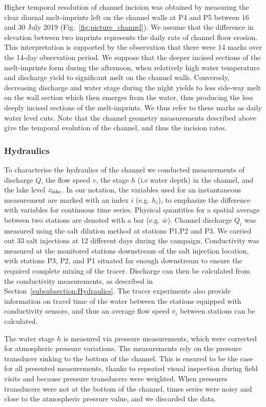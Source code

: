Higher temporal resolution of channel incision was obtained by measuring the clear diurnal melt-imprints left on the channel walls at P4 and P5 between 16 and 30 July 2019 (Fig.~\ref{fig:picture_channel}). We assume that the difference in elevation between two imprints represents the daily rate of channel floor erosion. This interpretation is supported by the observation that there were 14 marks over the 14-day observation period. We suppose that the deeper incised sections of the melt-imprints form during the afternoon, when relatively high water temperature and discharge yield to significant melt on the channel walls. Conversely, decreasing discharge and water stage during the night yields to less side-way melt on the wall section which then emerges from the water, thus producing the less deeply incised sections of the melt-imprints. We thus refer to these marks as daily water level cuts.
Note that the channel geometry measurements described above give the temporal evolution of the channel, and thus the incision rates.


\subsubsection{Hydraulics}

To characterise the hydraulics of the channel we conducted measurements of discharge $Q$, the flow speed $v$, the stage $h$ (i.e water depth) in the channel, and the lake level $z_{\rm lake }$. In our notation, the variables used for an instantaneous measurement are marked with an index $i$ (e.g. $h_i$), to emphasize the difference with variables for continuous time series. Physical quantities for a spatial average between two stations are denoted with a bar (e.g. $\bar w$).
Channel discharge $Q_i$ was measured using the salt dilution method \citep{Hubbard&Glasser2005} at stations P1,P2 and P3.
We carried out 33 salt injections at 12 different days during the campaign. Conductivity was measured at the monitored stations downstream of the salt injection location, with stations P3, P2, and P1 situated far enough downstream to ensure the required complete mixing of the tracer.
Discharge can then be calculated from the conductivity measurements, as described in Section~\ref{subsubsection:Hydraulics}.
%
The tracer experiments also provide information on travel time of the water between the stations equipped with conductivity sensors, and thus an average flow speed $\bar v_i$ between stations can be calculated.

The water stage $h$ is measured via pressure measurements, which were corrected for atmospheric pressure variations. The measurements rely on the pressure transducer sinking to the bottom of the channel. This is ensured to be the case for all presented measurements, thanks to repeated visual inspection during field visits and because pressure transducers were weighted.  When pressures transducers were not at the bottom of the channel, times series were noisy and close to the atmospheric pressure value, and we discarded the data.

